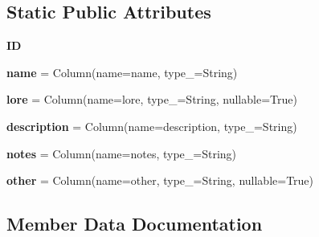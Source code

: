 \subsection*{Static Public Attributes}
\begin{DoxyCompactItemize}
\item 
{\bfseries ID}
\item 
{\bfseries name} = Column(name=\textquotesingle{}name\textquotesingle{}, type\+\_\+=String)\hypertarget{classatod_1_1models_1_1ability__texts_1_1_ability_texts_model_a04571921f6292e0d35a24650cf4f6a11}{}\label{classatod_1_1models_1_1ability__texts_1_1_ability_texts_model_a04571921f6292e0d35a24650cf4f6a11}

\item 
{\bfseries lore} = Column(name=\textquotesingle{}lore\textquotesingle{}, type\+\_\+=String, nullable=True)\hypertarget{classatod_1_1models_1_1ability__texts_1_1_ability_texts_model_a082bdb6d4a069fbd169a20ac03471f4b}{}\label{classatod_1_1models_1_1ability__texts_1_1_ability_texts_model_a082bdb6d4a069fbd169a20ac03471f4b}

\item 
{\bfseries description} = Column(name=\textquotesingle{}description\textquotesingle{}, type\+\_\+=String)\hypertarget{classatod_1_1models_1_1ability__texts_1_1_ability_texts_model_ae1f5093bb5c78691ed472f2ed08f1375}{}\label{classatod_1_1models_1_1ability__texts_1_1_ability_texts_model_ae1f5093bb5c78691ed472f2ed08f1375}

\item 
{\bfseries notes} = Column(name=\textquotesingle{}notes\textquotesingle{}, type\+\_\+=String)\hypertarget{classatod_1_1models_1_1ability__texts_1_1_ability_texts_model_afac8692d6f07adf20ac92f3fa4f1b285}{}\label{classatod_1_1models_1_1ability__texts_1_1_ability_texts_model_afac8692d6f07adf20ac92f3fa4f1b285}

\item 
{\bfseries other} = Column(name=\textquotesingle{}other\textquotesingle{}, type\+\_\+=String, nullable=True)\hypertarget{classatod_1_1models_1_1ability__texts_1_1_ability_texts_model_ab53f1505cccef3d64e83e35919b43922}{}\label{classatod_1_1models_1_1ability__texts_1_1_ability_texts_model_ab53f1505cccef3d64e83e35919b43922}

\end{DoxyCompactItemize}


\subsection{Member Data Documentation}
